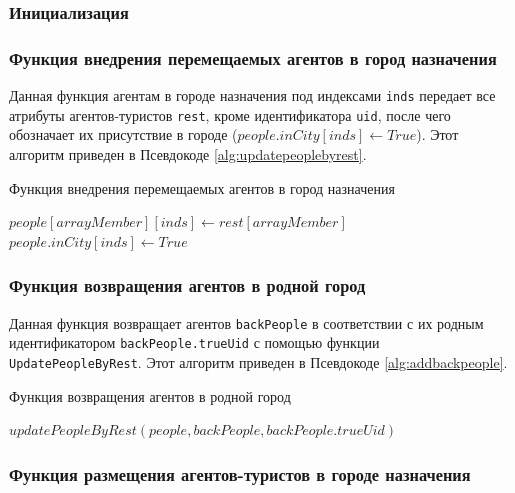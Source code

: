 \documentclass[a4paper,12pt]{article} %
\begin{document}
\subsubsection{Инициализация}

\subsubsection{Функция внедрения перемещаемых агентов в город назначения}

Данная функция агентам в городе назначения под индексами \texttt{inds} передает все атрибуты агентов-туристов \texttt{rest}, кроме идентификатора \texttt{uid}, после чего обозначает их присутствие в городе (\(people.inCity[inds] \gets True\)). Этот алгоритм приведен в Псевдокоде \ref{alg:updatepeoplebyrest}.

\begin{algorithm}[H]
\caption{Функция внедрения перемещаемых агентов в город назначения}
\label{alg:updatepeoplebyrest}
\begin{algorithmic}[1]
			\State \(people[arrayMember][inds] \gets rest[arrayMember]\)
		\EndIf
	\EndFor
	\State \(people.inCity[inds] \gets True\)
\EndFunction
\end{algorithmic}
\end{algorithm}

\subsubsection{Функция возвращения агентов в родной город}

Данная функция возвращает агентов \texttt{backPeople} в соответствии с их родным идентификатором \texttt{backPeople.trueUid} с помощью функции \texttt{UpdatePeopleByRest}. Этот алгоритм приведен в Псевдокоде \ref{alg:addbackpeople}.

\begin{algorithm}[H]
\caption{Функция возвращения агентов в родной город}
\label{alg:addbackpeople}
\begin{algorithmic}[1]
	\State \(updatePeopleByRest(people,backPeople,backPeople.trueUid)\)
\EndFunction
\end{algorithmic}
\end{algorithm}


\subsubsection{Функция размещения агентов-туристов в городе назначения}
\end{document}
